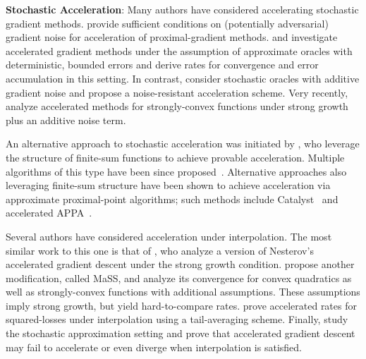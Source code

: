 \noindent \textbf{Stochastic Acceleration}: 
Many authors have considered accelerating stochastic gradient methods.
\citet{schmidt2011convergence} provide sufficient conditions on (potentially adversarial) gradient noise for acceleration of proximal-gradient methods.
\citet{aspremont2008approximate} and \citet{devolder2014first} investigate accelerated gradient methods under the assumption of approximate oracles with deterministic, bounded errors and derive rates for convergence and error accumulation in this setting.
In contrast, \citet{cohen2018acceleration} consider stochastic oracles with additive gradient noise and propose a noise-resistant acceleration scheme.
Very recently, \citet{chen2020understanding} analyze accelerated methods for strongly-convex functions under strong growth plus an additive noise term. 

An alternative approach to stochastic acceleration was initiated by \citet{allen-zhu2017katyusha}, who leverage the structure of finite-sum functions to achieve provable acceleration.
Multiple algorithms of this type have been since proposed~\citep{allen-zhou2018katyushax, tang2018restkatyusha, kovalev2020loopless}.
Alternative approaches also leveraging finite-sum structure have been shown to achieve acceleration via approximate proximal-point algorithms; such methods include Catalyst~\citep{lin2017catalyst} and accelerated APPA~\citep{frostig2015unregularizing}.

Several authors have considered acceleration under interpolation.
The most similar work to this one is that of \citet{vaswani2019fast}, who analyze a version of Nesterov's accelerated gradient descent under the strong growth condition. 
\citet{liu2020accelerating} propose another modification, called MaSS, and analyze its convergence for convex quadratics as well as strongly-convex functions with additional assumptions. 
These assumptions imply strong growth, but yield hard-to-compare rates. 
\citet{jain2018accelerating} prove accelerated rates for squared-losses under interpolation using a tail-averaging scheme. 
Finally, \citet{assran2020convergence} study the stochastic approximation setting and prove that accelerated gradient descent may fail to accelerate or even diverge when interpolation is satisfied.\\

